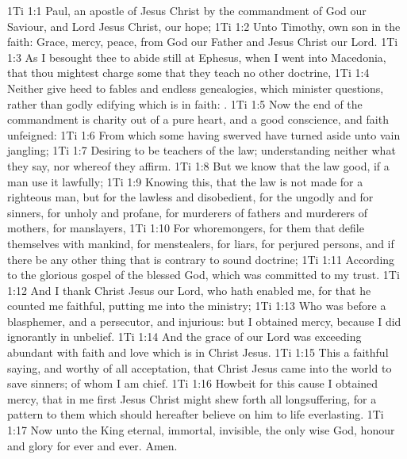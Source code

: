 \vs 1Ti 1:1 Paul, an apostle of Jesus Christ by the commandment of God our Saviour, and Lord Jesus Christ,  our hope;
\vs 1Ti 1:2 Unto Timothy,  own son in the faith: Grace, mercy,  peace, from God our Father and Jesus Christ our Lord.
\vs 1Ti 1:3 As I besought thee to abide still at Ephesus, when I went into Macedonia, that thou mightest charge some that they teach no other doctrine,
\vs 1Ti 1:4 Neither give heed to fables and endless genealogies, which minister questions, rather than godly edifying which is in faith: .
\vs 1Ti 1:5 Now the end of the commandment is charity out of a pure heart, and  a good conscience, and  faith unfeigned:
\vs 1Ti 1:6 From which some having swerved have turned aside unto vain jangling;
\vs 1Ti 1:7 Desiring to be teachers of the law; understanding neither what they say, nor whereof they affirm.
\vs 1Ti 1:8 But we know that the law  good, if a man use it lawfully;
\vs 1Ti 1:9 Knowing this, that the law is not made for a righteous man, but for the lawless and disobedient, for the ungodly and for sinners, for unholy and profane, for murderers of fathers and murderers of mothers, for manslayers,
\vs 1Ti 1:10 For whoremongers, for them that defile themselves with mankind, for menstealers, for liars, for perjured persons, and if there be any other thing that is contrary to sound doctrine;
\vs 1Ti 1:11 According to the glorious gospel of the blessed God, which was committed to my trust.
\vs 1Ti 1:12 And I thank Christ Jesus our Lord, who hath enabled me, for that he counted me faithful, putting me into the ministry;
\vs 1Ti 1:13 Who was before a blasphemer, and a persecutor, and injurious: but I obtained mercy, because I did  ignorantly in unbelief.
\vs 1Ti 1:14 And the grace of our Lord was exceeding abundant with faith and love which is in Christ Jesus.
\vs 1Ti 1:15 This  a faithful saying, and worthy of all acceptation, that Christ Jesus came into the world to save sinners; of whom I am chief.
\vs 1Ti 1:16 Howbeit for this cause I obtained mercy, that in me first Jesus Christ might shew forth all longsuffering, for a pattern to them which should hereafter believe on him to life everlasting.
\vs 1Ti 1:17 Now unto the King eternal, immortal, invisible, the only wise God,  honour and glory for ever and ever. Amen.
